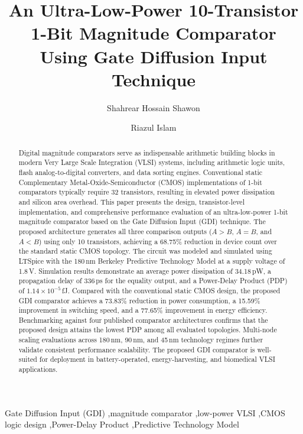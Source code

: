 \documentclass[final,5p,times,twocolumn]{elsarticle}
\begin{document}
\begin{frontmatter}

\title{An Ultra-Low-Power 10-Transistor 1-Bit Magnitude Comparator Using Gate Diffusion Input Technique}

\author[iiuc]{Shahrear Hossain Shawon}

\author[iiuc]{Riazul Islam}



\begin{abstract}
Digital magnitude comparators serve as indispensable arithmetic building blocks in modern Very Large Scale Integration (VLSI) systems, including arithmetic logic units, flash analog-to-digital converters, and data sorting engines. Conventional static Complementary Metal-Oxide-Semiconductor (CMOS) implementations of 1-bit comparators typically require 32 transistors, resulting in elevated power dissipation and silicon area overhead. This paper presents the design, transistor-level implementation, and comprehensive performance evaluation of an ultra-low-power 1-bit magnitude comparator based on the Gate Diffusion Input (GDI) technique. The proposed architecture generates all three comparison outputs ($A>B$, $A=B$, and $A<B$) using only 10 transistors, achieving a 68.75\% reduction in device count over the standard static CMOS topology. The circuit was modeled and simulated using LTSpice with the 180\,nm Berkeley Predictive Technology Model at a supply voltage of 1.8\,V. Simulation results demonstrate an average power dissipation of 34.18\,pW, a propagation delay of 336\,ps for the equality output, and a Power-Delay Product (PDP) of $1.14\times 10^{-5}$\,fJ. Compared with the conventional static CMOS design, the proposed GDI comparator achieves a 73.83\% reduction in power consumption, a 15.59\% improvement in switching speed, and a 77.65\% improvement in energy efficiency. Benchmarking against four published comparator architectures confirms that the proposed design attains the lowest PDP among all evaluated topologies. Multi-node scaling evaluations across 180\,nm, 90\,nm, and 45\,nm technology regimes further validate consistent performance scalability. The proposed GDI comparator is well-suited for deployment in battery-operated, energy-harvesting, and biomedical VLSI applications.
\end{abstract}

\begin{keyword}
Gate Diffusion Input (GDI) \sep magnitude comparator \sep low-power VLSI \sep CMOS logic design \sep Power-Delay Product \sep Predictive Technology Model
\end{keyword}

\end{frontmatter}
\end{document}
